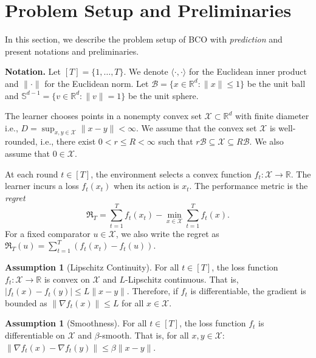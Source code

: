 \documentclass[journal,onecolumn]{IEEEtran}
\newcommand{\cB}{\mathcal{B}}
\newcommand{\cX}{\mathcal{X}}
\theoremstyle{plain}
\theoremstyle{definition}
\newtheorem{assumption}[theorem]{Assumption}
\theoremstyle{remark}
\newcommand{\regret}{\mathfrak{R}}
\begin{document}
\section{Problem Setup and Preliminaries}
\label{sec:setup}

In this section, we describe the problem setup of  BCO with \emph{prediction} and present notations and preliminaries.  

\textbf{Notation.}
Let $[T]=\{1,\dots,T\}$. We denote $\langle \cdot,\cdot\rangle$ for the Euclidean
inner product and $\|\cdot\|$ for the Euclidean norm. Let
$\cB=\{x\in\mathbb{R}^{d}:\|x\|\le 1\}$ be the unit ball and
$\mathbb{S}^{d-1}=\{v\in\mathbb{R}^{d}:\|v\|=1\}$ be the unit sphere.

The learner chooses points in a nonempty convex set $\cX\subset \mathbb{R}^{d}$
with finite diameter i.e., $D=\sup_{x,y\in\cX}\|x-y\|< \infty$. We assume that the
convex set $\cX$ is well-rounded, i.e., there exist $0< r\leq R<\infty$ such
that $r\cB\subseteq \cX\subseteq R\cB$. We also assume that $0\in\cX$.

At each round  $t\in[T]$, the environment selects a convex function
$f_{t}:\cX\rightarrow \mathbb{R}$. The learner incurs a loss $f_{t}(x_{t})$ when
its action is $x_{t}$. The performance metric is the {\em regret} 
\begin{equation}
    \label{eq:regret_def}\regret_{T}=\sum_{t=1}^{T}f_{t}(x_{t})-\min_{x\in\cX}\sum
    _{t=1}^{T}f_{t}(x).
\end{equation}
For a fixed comparator $u\in\cX$, we also write the regret as
$\regret_{T}(u)=\sum_{t=1}^{T}(f_{t}(x_{t})-f_{t}(u))$.

\begin{assumption}
    [Lipschitz Continuity] \label{ass:lipschitz} For all $t \in [T]$,
    the loss function $f_{t}: \cX \to \mathbb{R}$ is convex on $\cX$ and $L$-Lipschitz
    continuous. That is, $|f_{t}(x) - f_{t}(y)| \le L \|x - y\|$.
    Therefore, if $f_{t}$ is differentiable, the gradient is
    bounded as $\|\nabla f_{t}(x)\|\le L$ for all $x\in\cX$.
\end{assumption}

\begin{assumption}
    [Smoothness]\label{ass:smoothness} For all $t \in [T]$, the loss function $f_{t}$
    is differentiable on $\cX$ and $\beta$-smooth. That is, for all $x, y \in \cX$: $\|\nabla f_{t}(x) - \nabla f_{t}(y)\|\le \beta \|x - y\|$.
\end{assumption}
\end{document}
